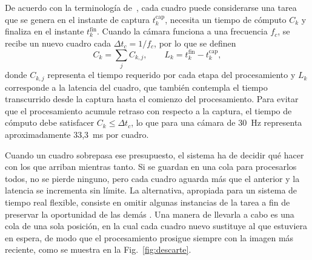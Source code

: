 De acuerdo con la terminología de~\cite{buttazzo2011realtime}, cada cuadro puede considerarse una tarea que se genera en el instante de captura $t_k^{\mathrm{cap}}$, necesita un tiempo de cómputo $C_k$ y finaliza en el instante $t_k^{\mathrm{fin}}$.
Cuando la cámara funciona a una frecuencia $f_c$, se recibe un nuevo cuadro cada $\Delta t_c = 1/f_c$, por lo que se definen
\begin{equation}
C_k = \sum_{j} C_{k,j},
\qquad
L_k = t_k^{\mathrm{fin}} - t_k^{\mathrm{cap}},
\label{eq:tiempo-real}
\end{equation}
donde $C_{k,j}$ representa el tiempo requerido por cada etapa del procesamiento y $L_k$ corresponde a la latencia del cuadro, que también contempla el tiempo transcurrido desde la captura hasta el comienzo del procesamiento.
Para evitar que el procesamiento acumule retraso con respecto a la captura, el tiempo de cómputo debe satisfacer $C_k \le \Delta t_c$, lo que para una cámara de 30~Hz representa aproximadamente 33,3~ms por cuadro.

Cuando un cuadro sobrepasa ese presupuesto, el sistema ha de decidir qué hacer con los que arriban mientras tanto.
Si se guardan en una cola para procesarlos todos, no se pierde ninguno, pero cada cuadro aguarda más que el anterior y la latencia se incrementa sin límite.
La alternativa, apropiada para un sistema de tiempo real flexible, consiste en omitir algunas instancias de la tarea a fin de preservar la oportunidad de las demás \cite{buttazzo2011realtime}.
Una manera de llevarla a cabo es una cola de una sola posición, en la cual cada cuadro nuevo sustituye al que estuviera en espera, de modo que el procesamiento prosigue siempre con la imagen más reciente, como se muestra en la Fig.~\ref{fig:descarte}.

